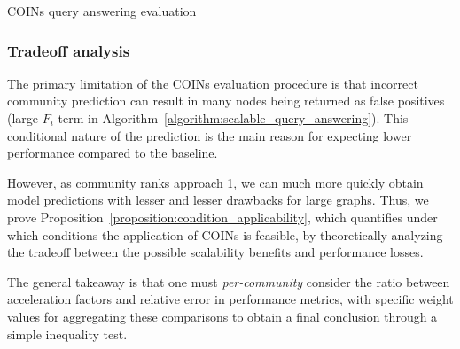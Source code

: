 \begin{algorithm}[H]
\caption{COINs query answering evaluation}
\label{algorithm:scalable_query_answering}
\begin{algorithmic}[1]
\ENDFOR
{}
\end{algorithmic}
\end{algorithm} 


\subsubsection{Tradeoff analysis}

The primary limitation of the COINs evaluation procedure is that incorrect community prediction can result in many nodes being returned as false positives (large $F_i$ term in Algorithm~\ref{algorithm:scalable_query_answering}). This conditional nature of the prediction is the main reason for expecting lower performance compared to the baseline. 

However, as community ranks approach 1, we can much more quickly obtain model predictions with lesser and lesser drawbacks for large graphs. Thus, we prove Proposition~\ref{proposition:condition_applicability}, which quantifies under which conditions the application of COINs is feasible, by theoretically analyzing the tradeoff between the possible scalability benefits and performance losses. 

The general takeaway is that one must \emph{per-community} consider the ratio between acceleration factors and relative error in performance metrics, with specific weight values for aggregating these comparisons to obtain a final conclusion through a simple inequality test.


